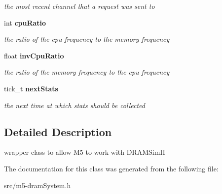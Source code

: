 \begin{CompactItemize}
\begin{CompactList}\small\item\em the most recent channel that a request was sent to \item\end{CompactList}\item 
int {\bf cpuRatio}\label{class_m5dram_system_2fbee1e022242e218e235df762bcd82a}

\begin{CompactList}\small\item\em the ratio of the cpu frequency to the memory frequency \item\end{CompactList}\item 
float {\bf invCpuRatio}\label{class_m5dram_system_1411a566b736381786dc016cd805f323}

\begin{CompactList}\small\item\em the ratio of the memory frequency to the cpu frequency \item\end{CompactList}\item 
tick\_\-t {\bf nextStats}\label{class_m5dram_system_9d339378e2fedd6579c6ea8649f34d30}

\begin{CompactList}\small\item\em the next time at which stats should be collected \item\end{CompactList}\end{CompactItemize}


\subsection{Detailed Description}
wrapper class to allow M5 to work with DRAMSimII 

The documentation for this class was generated from the following file:\begin{CompactItemize}
\item 
src/m5-dramSystem.h\end{CompactItemize}
